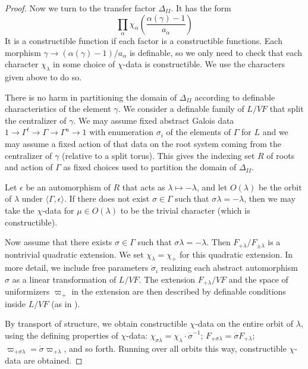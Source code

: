 \begin{proof}
Now we turn to the transfer factor $\Delta_{II}$.  It has the form
\[
\prod_\alpha \chi_\alpha\left(\frac{\alpha(\gamma)-1}{a_\alpha}\right)
\]
It is a constructible function if each factor is a constructible functions. Each morphism $\gamma\to(\alpha(\gamma)-1)/a_\alpha$ is
definable, so we only need to check that each character $\chi_\lambda$ in some choice of $\chi$-data is constructible.  We use the characters
given above to do so.

There is no harm in partitioning the domain of $\Delta_{II}$   according to definable characteristics of the element $\gamma$.  We consider a definable family of
 $L/VF$ that split the centralizer of $\gamma$.  We may assume fixed abstract Galois data $1\to\Gamma^t\to\Gamma\to \Gamma^u\to 1$ with
enumeration $\sigma_i$ of the elements of $\Gamma$ for $L$
and we may assume a fixed action of that data on the root system coming from the centralizer of $\gamma$ (relative to a split torus).   This gives the
indexing set $R$ of roots and action of $\Gamma$ as fixed choices used to partition the domain of $\Delta_{II}$.

Let $\epsilon$ be an automorphism of $R$ that acts as $\lambda\mapsto -\lambda$, and let $O(\lambda)$ be the orbit of $\lambda$ under $\langle\Gamma,\epsilon\rangle$.
If there does not exist $\sigma\in\Gamma$ such that $\sigma\lambda=-\lambda$, then we may take the $\chi$-data for $\mu\in O(\lambda)$ to be the trivial character
(which is constructible).   

Now assume that there exists $\sigma\in\Gamma$ such that $\sigma\lambda = -\lambda$.  Then $F_{+\lambda}/F_{\pm \lambda}$ is a nontrivial quadratic extension.
We set $\chi_\lambda = \chi_+$ for this quadratic extension.  
In more detail,
we include free parameters $\dot\sigma_i$ realizing each abstract automorphism $\sigma$ as a linear transformation of $L/VF$.
The extension $F_{+\lambda}/VF$ and the space of uniformizers $\varpi_+$ in the extension are then described by definable conditions inside $L/VF$ (as in \cite{cluckers2011transfer}).

By transport of structure, we obtain constructible $\chi$-data on the entire orbit of $\lambda$, using the defining properties of $\chi$-data:
$\chi_{\sigma\lambda} = \chi_{\lambda}\cdot \dot\sigma^{-1}$; $F_{+\sigma\lambda}=\dot\sigma F_{+\lambda}$; $\varpi_{+\sigma\lambda}=\dot\sigma\varpi_{+\lambda}$,
and so forth.   Running over all orbits this way, constructible $\chi$-data are obtained.
\end{proof}


